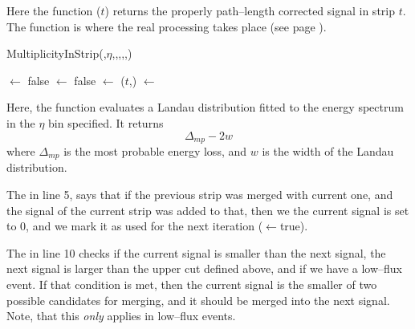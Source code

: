 \documentclass[11pt]{article}
\begin{document}
Here the function ($t$) returns the properly
path--length corrected signal in strip $t$.  The function
 is where the real processing takes
place (see page \pageref{func:MultiplicityInStrip}). 

\begin{function}[htbp]
  \caption{MultiplicityInStrip(,$\eta$,,,,,)} 
  \label{func:MultiplicityInStrip}
   {
    \usedThis $\leftarrow$ false\;
    \usedPrev $\leftarrow$ false\;
  }
  \highCut $\leftarrow$ \GetHighCut($t$,\Eta)\;
  \total $\leftarrow$ \Current\;
\end{function}
Here, the function  evaluates a Landau
distribution fitted to the energy spectrum in the $\eta$ bin
specified.  It returns 
$$
\Delta_{mp} - 2 w
$$
where $\Delta_{mp}$ is the most probable energy loss, and $w$ is the
width of the Landau distribution.  

The  in line 5, says that if the previous strip was merged
with current one, and the signal of the current strip was added to
that, then we the current signal is set to 0, and we mark it as used
for the next iteration ($\leftarrow$true). 

The  in line 10 checks if the current signal is smaller than
the next signal, the next signal is larger than the upper cut defined
above, and if we have a low--flux event.  If that condition is met,
then the current signal is the smaller of two possible candidates for
merging, and it should be merged into the next signal.  Note, that
this \emph{only} applies in low--flux events.  
\end{document}
